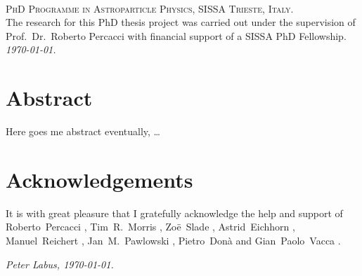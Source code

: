 \documentclass[11pt]{book} %
\numberwithin{equation}{chapter}
\begin{document}



\newpage
~\vfill
\thispagestyle{empty}

\noindent \textsc{PhD Programme in Astroparticle Physics, SISSA Trieste, Italy.}\\

\noindent The research for this PhD thesis project was carried out
under the supervision of Prof.~Dr.~Roberto Percacci with financial support
of a SISSA PhD Fellowship.\\

\noindent \textit{\monthyeardate\today.} %


\frontmatter %

\chapter*{Abstract}

\vfill
\begin{center}
  Here goes me abstract eventually, \dots
\end{center}
\vfill


\chapter*{Acknowledgements}

It is with great pleasure that I gratefully acknowledge the help and support
of
Roberto~Percacci%
, Tim~R.~Morris%
, Zo\"e~Slade%
, Astrid~Eichhorn%
, Manuel~Reichert%
, Jan~M.~Pawlowski%
, Pietro~Don\`a
and
Gian~Paolo~Vacca%
.

\begin{flushright}
  \textit{Peter Labus, \monthyeardate\today.}
\end{flushright}
\end{document}
